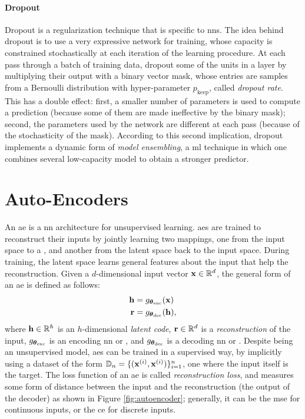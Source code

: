 \paragraph{Dropout}
Dropout is a regularization technique that is specific to \glspl{nn}. The idea behind dropout is to use a very expressive network for training, whose capacity is constrained stochastically at each iteration of the learning procedure. At each pass through a batch of training data, dropout  some of the units in a layer by multiplying their output with a binary vector mask, whose entries are samples from a Bernoulli distribution with hyper-parameter $p_{\mathrm{keep}}$, called \emph{dropout rate}. This has a double effect: first, a smaller number of parameters is used to compute a prediction (because some of them are made ineffective by the binary mask); second, the parameters used by the network are different at each pass (because of the stochasticity of the mask). According to this second implication, dropout implements a dynamic form of \emph{model ensembling}, a \gls{ml} technique in which one combines several low-capacity model to obtain a stronger predictor.

\section{Auto-Encoders}
An \gls{ae} is a \gls{nn} architecture for unsupervised learning. \glspl{ae} are trained to reconstruct their inputs by jointly learning two mappings, one from the input space to a , and another from the latent space back to the input space. During training, the latent space learns general features about the input that help the reconstruction. Given a $d$-dimensional input vector $\Vector{x} \in \Real^d$, the general form of an \gls{ae} is defined as follows:
\begin{align*}
    \Vector{h} &= g_{\Param_{\Fun{enc}}}(\Vector{x})\\
    \Vector{r} &= g_{\Param_{\Fun{dec}}}(\Vector{h}),
\end{align*}
where $\Vector{h} \in \Real^h$ is an $h$-dimensional \emph{latent code}, $\Vector{r} \in \Real^d$ is a \emph{reconstruction} of the input, $g_{\boldsymbol{\theta}_{\mathrm{enc}}}$ is an encoding \gls{nn} or , and $g_{\boldsymbol{\theta}_{\mathrm{dec}}}$ is a decoding \gls{nn} or . Despite being an unsupervised model, \glspl{ae} can be trained in a supervised way, by implicitly using a dataset of the form $\Data_n = \Set{(\VPattern{x}{i}, \VPattern{x}{i})}_{i=1}^n$, \ie one where the input itself is the target. The loss function of an \gls{ae} is called \emph{reconstruction loss}, and measures some form of distance between the input and the reconstruction (the output of the decoder) as shown in Figure \ref{fig:autoencoder}; generally, it can be the \gls{mse} for continuous inputs, or the \gls{ce} for discrete inputs.

